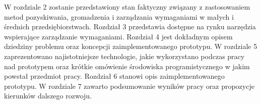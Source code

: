       W rozdziale 2 zostanie przedstawiony stan faktyczny związany z zastosowaniem metod pozyskiwania, gromadzenia i zarządzania wymaganiami w małych i średnich przedsiębiorstwach. Rozdział 3 przedstawia dostępne na rynku narzędzia wspierające zarządzanie wymaganiami. Rozdział 4 jest dokładnym opisem dziedziny problemu oraz koncepcji zaimplementowanego prototypu. W rozdziale 5 zaprezentowano najistotniejsze technologie, jakie wykorzystano podczas pracy nad prototypem oraz krótkie omówienie środowiska programistycznego w jakim powstał przedmiot pracy. Rozdział 6 stanowi opis zaimplementowanego prototypu. W rozdziale 7 zawarto podsumowanie wyników pracy oraz propozycje kierunków dalszego rozwoju. 

